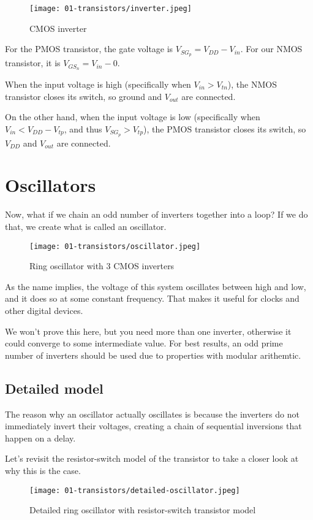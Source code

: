 \documentclass[11pt]{article}
\begin{document}
\begin{figure}[H]
    \centering
        \texttt{[image: 01-transistors/inverter.jpeg]}
    \caption{CMOS inverter}
\end{figure}

For the PMOS transistor, the gate voltage is $V_{SG_p}=V_{DD}-V_{in}$. For our NMOS transistor, it is $V_{GS_n}=V_{in}-0$. 

When the input voltage is high (specifically when $V_{in}>V_{tn}$), the NMOS transistor closes its switch, so ground and $V_{out}$ are connected.

On the other hand, when the input voltage is low (specifically when $V_{in}<V_{DD}-V_{tp}$, and thus $V_{SG_p}>V_{tp}$), the PMOS transistor closes its switch, so $V_{DD}$ and $V_{out}$ are connected.

\section{Oscillators}

Now, what if we chain an odd number of inverters together into a loop? If we do that, we create what is called an oscillator. 

\begin{figure}[H]
    \centering
        \texttt{[image: 01-transistors/oscillator.jpeg]}
    \caption{Ring oscillator with 3 CMOS inverters}
\end{figure}

As the name implies, the voltage of this system oscillates between high and low, and it does so at some constant frequency. That makes it useful for clocks and other digital devices.

We won't prove this here, but you need more than one inverter, otherwise it could converge to some intermediate value. For best results, an odd prime number of inverters should be used due to properties with modular arithemtic. 

\subsection{Detailed model}
The reason why an oscillator actually oscillates is because the inverters do not immediately invert their voltages, creating a chain of sequential inversions that happen on a delay. 

Let's revisit the resistor-switch model of the transistor to take a closer look at why this is the case. 

\begin{figure}[H]
    \centering
        \texttt{[image: 01-transistors/detailed-oscillator.jpeg]}
    \caption{Detailed ring oscillator with resistor-switch transistor model}
\end{figure}
\end{document}
